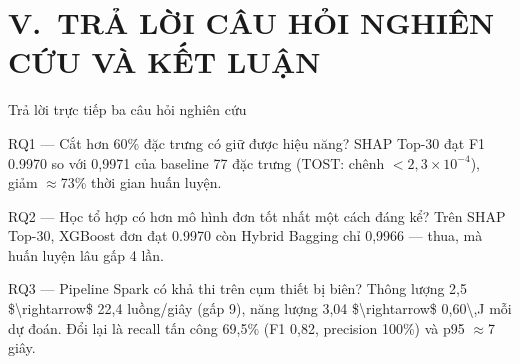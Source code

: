 \documentclass[aspectratio=169, 11pt]{beamer}
\begin{document}
\section{V.\ TRẢ LỜI CÂU HỎI NGHIÊN CỨU VÀ KẾT LUẬN}

\begin{frame}{Trả lời trực tiếp ba câu hỏi nghiên cứu}
  \begin{block}{RQ1 --- Cắt hơn 60\% đặc trưng có giữ được hiệu năng?}
     SHAP Top-30 đạt F1 \num{0,9970} so với 0,9971 của baseline 77 đặc
    trưng (TOST: chênh $< 2{,}3\times10^{-4}$), giảm $\approx$73\% thời gian
    huấn luyện.
  \end{block}
  \begin{block}{RQ2 --- Học tổ hợp có hơn mô hình đơn tốt nhất một cách đáng kể?}
     Trên SHAP Top-30, XGBoost đơn đạt \num{0,9970} còn Hybrid
    Bagging chỉ 0,9966 --- thua, mà huấn luyện lâu gấp 4 lần.
  \end{block}
  \begin{block}{RQ3 --- Pipeline Spark có khả thi trên cụm thiết bị biên?}
    Thông lượng \num{2,5 $\rightarrow$ 22,4} luồng/giây (gấp 9), năng lượng
    \num{3,04 $\rightarrow$ 0,60\,J} mỗi dự đoán. Đổi lại là recall tấn công
    69,5\% (F1 0,82, precision 100\%) và p95 $\approx$7\,giây.
  \end{block}
\end{frame}
\end{document}
